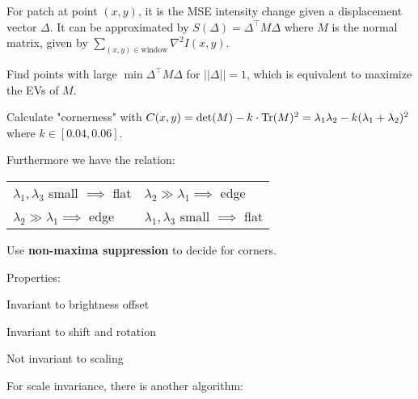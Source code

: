 \begin{definition}
For patch at point \((x, y)\), it is the MSE intensity change given a displacement vector \(\Delta\).
It can be approximated by \(S(\Delta) = \Delta^\top M \Delta\)
where \(M\) is the normal matrix, given by \(\sum_{(x, y) \in \text{window}} \nabla^2 I(x, y)\).

\end{definition}


\begin{algorithm}
  Find points with large \(\min \Delta^\top M \Delta\) for \(||\Delta|| = 1\), which is equivalent to maximize the EVs of \(M\).

  Calculate "cornerness" with \(C(x, y) = \det(M) - k \cdot \operatorname{Tr}(M)^2 = \lambda_1 \lambda_2 - k(\lambda_1 + \lambda_2)^2\) where \(k \in [0.04, 0.06]\).

  Furthermore we have the relation:

  \begin{center}
    \begin{tabularx}{\linewidth}{XX}
      \(\lambda_1, \lambda_3\) small \(\implies\) flat & \(\lambda_2 \gg \lambda_1 \implies\) edge \\
      \(\lambda_2 \gg \lambda_1 \implies\) edge & \(\lambda_1, \lambda_3\) small \(\implies\) flat
    \end{tabularx}
  \end{center}

  Use \textbf{non-maxima suppression} to decide for corners.

  Properties:
  \begin{itemize*}
    \item Invariant to brightness offset
    \item Invariant to shift and rotation
    \item Not invariant to scaling
  \end{itemize*}
\end{algorithm}

For scale invariance, there is another algorithm:

